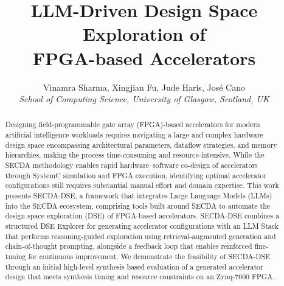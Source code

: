 \documentclass[sigplan,screen]{acmart}
\begin{document}
\title[LLM-Driven Design Space Exploration of FPGA-based Accelerators]{LLM-Driven Design Space Exploration of \\ FPGA-based Accelerators}


\author{Vinamra Sharma, Xingjian Fu, Jude Haris, Jos\'e Cano \\
\emph{School of Computing Science, University of Glasgow, Scotland, UK}
}


\renewcommand{\shortauthors}{Sharma et al.}



\begin{abstract}

Designing field-programmable gate array (FPGA)-based accelerators for modern artificial intelligence workloads requires navigating a large and complex hardware design space encompassing architectural parameters, dataflow strategies, and memory hierarchies, making the process time-consuming and resource-intensive. 
While the SECDA methodology enables rapid hardware–software co-design of accelerators through SystemC simulation and FPGA execution, identifying optimal accelerator configurations still requires substantial manual effort and domain expertise. 
This work presents SECDA-DSE, a framework that integrates Large Language Models (LLMs) into the SECDA ecosystem, comprising tools built around SECDA to automate the design space exploration (DSE) of FPGA-based accelerators. 
SECDA-DSE combines a structured DSE Explorer for generating accelerator configurations with an LLM Stack that performs reasoning-guided exploration using retrieval-augmented generation and chain-of-thought prompting, alongside a feedback loop that enables reinforced fine-tuning for continuous improvement. 
We demonstrate the feasibility of SECDA-DSE through an initial high-level synthesis based evaluation of a generated accelerator design that meets synthesis timing and resource constraints on an Zynq-7000 FPGA.

\end{abstract}

\end{document}
